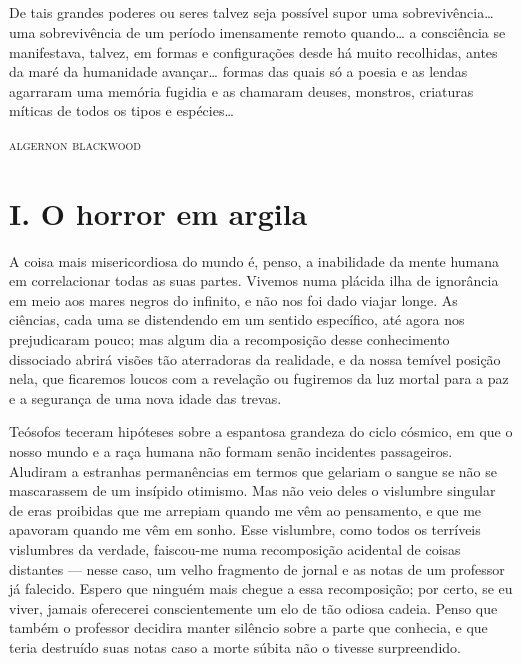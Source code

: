 

\section*{}
\thispagestyle{empty}

\epigraph{De tais grandes poderes ou seres talvez seja possível supor uma
sobrevivência\ldots{} uma sobrevivência de um período imensamente remoto
quando\ldots{} a consciência se manifestava, talvez, em formas e
configurações desde há muito recolhidas, antes da maré da humanidade
avançar\ldots{} formas das quais só a poesia e as lendas agarraram uma
memória fugidia e as chamaram deuses, monstros, criaturas míticas de
todos os tipos e espécies\ldots{}}{\textsc{algernon blackwood}\footnotemark}


\chapter{I. O horror em argila}

A coisa mais misericordiosa do mundo é, penso, a inabilidade da mente
humana em correlacionar todas as suas partes. Vivemos numa plácida ilha
de ignorância em meio aos mares negros do infinito, e não nos foi dado
viajar longe. As ciências, cada uma se distendendo em um sentido
específico, até agora nos prejudicaram pouco; mas algum dia a
recomposição desse conhecimento dissociado abrirá visões tão aterradoras
da realidade, e da nossa temível posição nela, que ficaremos loucos com
a revelação ou fugiremos da luz mortal para a paz e a segurança de uma
nova idade das trevas.

Teósofos teceram hipóteses sobre a espantosa grandeza do ciclo cósmico,
em que o nosso mundo e a raça humana não formam senão incidentes
passageiros. Aludiram a estranhas permanências em termos que gelariam o
sangue se não se mascarassem de um insípido otimismo. Mas não veio deles
o vislumbre singular de eras proibidas que me arrepiam quando me vêm ao
pensamento, e que me apavoram quando me vêm em sonho. Esse vislumbre,
como todos os terríveis vislumbres da verdade, faiscou-me numa
recomposição acidental de coisas distantes --- nesse caso, um velho
fragmento de jornal e as notas de um professor já falecido. Espero que
ninguém mais chegue a essa recomposição; por certo, se eu viver, jamais
oferecerei conscientemente um elo de tão odiosa cadeia. Penso que também
o professor decidira manter silêncio sobre a parte que conhecia, e que
teria destruído suas notas caso a morte súbita não o tivesse
surpreendido.


